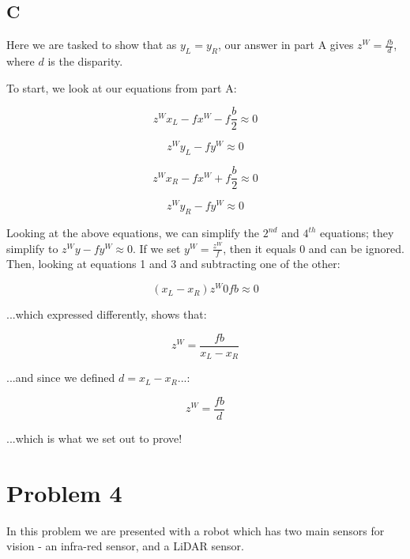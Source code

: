 \documentclass{article}
\begin{document}
\subsection*{C}

Here we are tasked to show that as $y_L=y_R$, our answer in part A gives $z^W=\frac{fb}{d}$, where $d$ is the disparity.

\noindent To start, we look at our equations from part A:

\begin{equation}
    z^W x_L - f x^W - f \frac{b}{2} \approx 0
\end{equation}

\begin{equation}
    z^W y_L - f y^W \approx 0
\end{equation}

\begin{equation}
    z^W x_R - f x^W + f \frac{b}{2} \approx 0
\end{equation}

\begin{equation}
    z^W y_R - f y^W \approx 0
\end{equation}

Looking at the above equations, we can simplify the $2^{nd}$ and $4^{th}$ equations; they simplify to $z^Wy - fy^W \approx 0$. If we set $y^W = \frac{z^W}{f}$, then it equals $0$ and can be ignored. Then, looking at equations 1 and 3 and subtracting one of the other:

\begin{equation}
    (x_L-x_R)z^W 0 fb \approx 0
\end{equation}

\noindent ...which expressed differently, shows that:

\begin{equation}
    z^W = \frac{fb}{x_L-x_R}
\end{equation}

\noindent ...and since we defined $d=x_L-x_R$...:

\begin{equation}
    z^W = \frac{fb}{d}
\end{equation}

\noindent ...which is what we set out to prove!


\section*{Problem 4}

In this problem we are presented with a robot which has two main sensors for vision - an infra-red sensor, and a LiDAR sensor.
\end{document}
